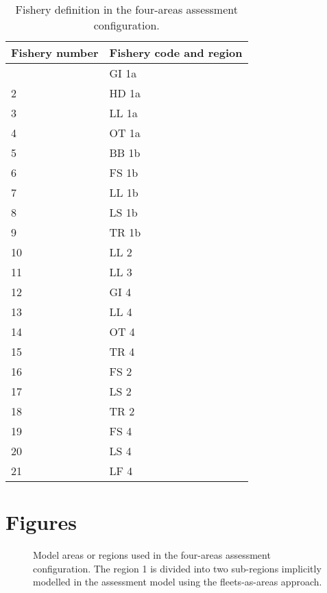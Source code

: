 \documentclass[
]{scrartcl}
\begin{document}
\newpage{}

\begin{longtable}[]{@{}ll@{}}

\caption{\label{tbl-fleet-4A}Fishery definition in the four-areas
assessment configuration.}

\tabularnewline

\toprule\noalign{}
Fishery number & Fishery code and region \\
\midrule\noalign{}
\endhead
\bottomrule\noalign{}
\endlastfoot
1 & GI 1a \\
2 & HD 1a \\
3 & LL 1a \\
4 & OT 1a \\
5 & BB 1b \\
6 & FS 1b \\
7 & LL 1b \\
8 & LS 1b \\
9 & TR 1b \\
10 & LL 2 \\
11 & LL 3 \\
12 & GI 4 \\
13 & LL 4 \\
14 & OT 4 \\
15 & TR 4 \\
16 & FS 2 \\
17 & LS 2 \\
18 & TR 2 \\
19 & FS 4 \\
20 & LS 4 \\
21 & LF 4 \\

\end{longtable}

\newpage{}

\section{Figures}\label{figures}

\begin{figure}


\caption{\label{fig-4A-config}Model areas or regions used in the
four-areas assessment configuration. The region 1 is divided into two
sub-regions implicitly modelled in the assessment model using the
fleets-as-areas approach.}

\end{figure}%
\end{document}

